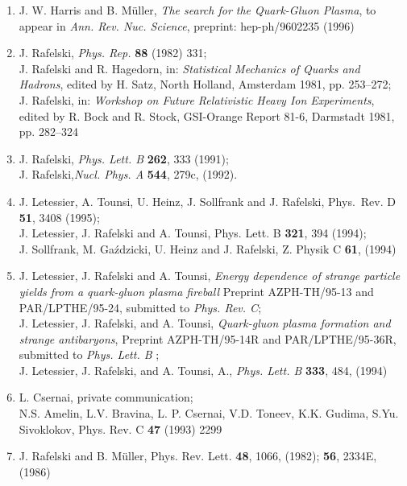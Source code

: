 \begin{mdframed}[linecolor=gray,roundcorner=12pt,backgroundcolor=Dandelion!15,linewidth=1pt,leftmargin=0cm,rightmargin=0cm,topline=true,bottomline=true,skipabove=12pt]
{\begin{enumerate}
\item%
J. W. Harris and B. M\"uller, {\it The search for the Quark-Gluon Plasma},
to appear in {\it Ann. Rev. Nuc. Science}, preprint: hep-ph/9602235 (1996) 

\item%
J. Rafelski, {\it Phys. Rep.} {\bf 88} (1982) 331;\\
J. Rafelski and R. Hagedorn, in: {\it Statistical
Mechanics of Quarks and Hadrons}, edited by H. Satz, North Holland, 
Amsterdam 1981, pp. 253--272;\\ 
J. Rafelski, in: {\it Workshop on Future Relativistic
Heavy Ion Experiments}, edited by  R. Bock and R. Stock, GSI-Orange 
Report 81-6, Darmstadt 1981, pp. 282--324 

\item%
J. Rafelski, {\it Phys. Lett. B} {\bf 262}, 333 (1991); \\
J. Rafelski,{\it Nucl. Phys. A} {\bf 544}, 279c, (1992).
 
\item%
J. Letessier, A. Tounsi, U. Heinz, J. Sollfrank and J. Rafelski, 
{Phys.\ Rev.} D {\bf 51}, 3408 (1995);\\
J. Letessier, J. Rafelski and  A. Tounsi,  {Phys. Lett.} B {\bf 321}, 394
(1994);\\
J. Sollfrank, M. Ga\'zdzicki, U. Heinz and J. Rafelski,  {Z. Physik} C
{\bf 61}, (1994) 
 
\item%
J. Letessier, J. Rafelski and A. Tounsi, 
{\it Energy dependence of strange particle yields from
a quark-gluon plasma fireball} Preprint AZPH-TH/95-13
and PAR/LPTHE/95-24, submitted to {\it Phys. Rev. C};\\
J. Letessier, J. Rafelski,  and A. Tounsi,
{\it Quark-gluon plasma formation and strange antibaryons}, 
Preprint AZPH-TH/95-14R and PAR/LPTHE/95-36R,
submitted to {\it Phys. Lett. B} ;\\
J. Letessier, J. Rafelski,  and A. Tounsi, A., 
{\it Phys. Lett. B} {\bf 333}, 484, (1994) 

\item%
L. Csernai, private communication;\\
N.S. Amelin, L.V. Bravina, L. P. Csernai, V.D. Toneev, K.K.
Gudima, S.Yu. Sivoklokov, {Phys. Rev.} C {\bf
47} (1993) 2299 
 

\item%
J. Rafelski and B. M\" uller, Phys. Rev. Lett.  {\bf 
48}, 1066, (1982); {\bf 56}, 2334E, (1986) 


\end{enumerate}}
\end{mdframed}
